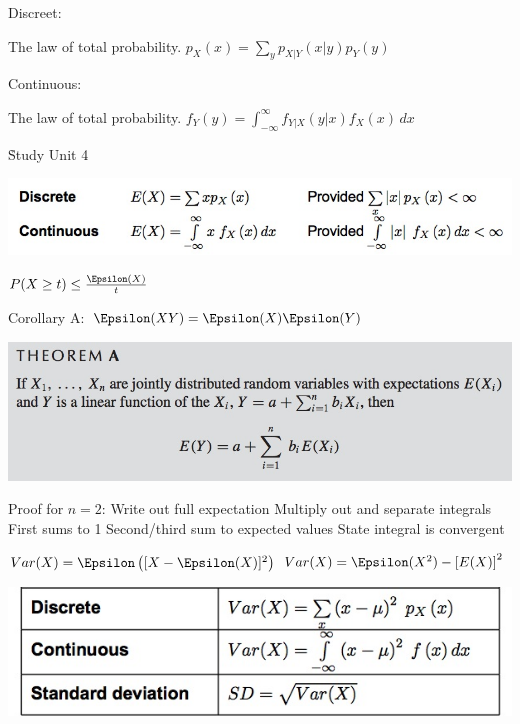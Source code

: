 \documentclass{examnotes}
\newcommand{\E}{\Epsilon}
\begin{document}
{

Discreet:

The law of total probability. $p_X(x)=\displaystyle\sum_y{p_{X|Y}(x|y)p_Y(y)}$

Continuous:

The law of total probability. $f_Y(y)=\displaystyle\int_{-\infty}^\infty{f_{Y|X}(y|x)f_X(x)\,dx}$

\h{Study Unit 4}

\includegraphics[scale=0.5]{./img/41.jpg}

$P(X\ge t)\le \frac{\Epsilon(X)}{t}$

\ra Corollary A:  $\E(XY)=\E(X)\E(Y)$

\includegraphics[scale=0.4]{./img/412A.jpg}

\ra Proof for $n=2$: 
 Write out full expectation
 Multiply out and separate integrals
 First sums to 1
 Second/third sum to expected values
 State integral is convergent


$Var(X)=\E\left([X-\E(X)]^2\right) $
$Var(X)=\E(X^2)-\left[E(X)\right]^2$

\vspace{6pt}
\includegraphics[scale=0.4]{./img/42.jpg}

}
\end{document}
